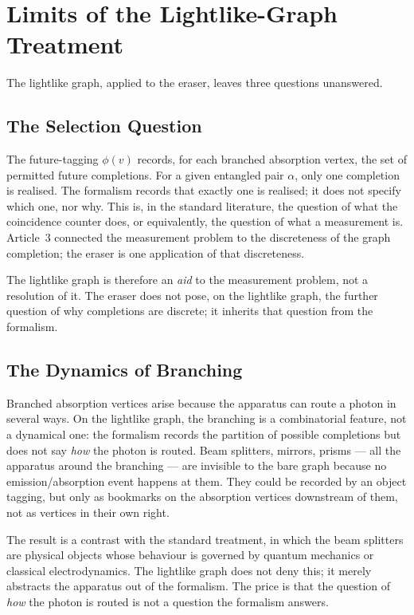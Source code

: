 \documentclass[11pt]{article}
\begin{document}
\section{Limits of the Lightlike-Graph Treatment}
\label{sec:limits}

The lightlike graph, applied to the eraser, leaves three questions unanswered.

\subsection{The Selection Question}

The future-tagging $\phi(v)$ records, for each branched absorption vertex, the set of permitted future completions. For a given entangled pair $\alpha$, only one completion is realised. The formalism records that exactly one is realised; it does not specify which one, nor why. This is, in the standard literature, the question of what the coincidence counter does, or equivalently, the question of what a measurement is. Article~3 connected the measurement problem to the discreteness of the graph completion; the eraser is one application of that discreteness.

The lightlike graph is therefore an \emph{aid} to the measurement problem, not a resolution of it. The eraser does not pose, on the lightlike graph, the further question of why completions are discrete; it inherits that question from the formalism.

\subsection{The Dynamics of Branching}

Branched absorption vertices arise because the apparatus can route a photon in several ways. On the lightlike graph, the branching is a combinatorial feature, not a dynamical one: the formalism records the partition of possible completions but does not say \emph{how} the photon is routed. Beam splitters, mirrors, prisms --- all the apparatus around the branching --- are invisible to the bare graph because no emission/absorption event happens at them. They could be recorded by an object tagging, but only as bookmarks on the absorption vertices downstream of them, not as vertices in their own right.

The result is a contrast with the standard treatment, in which the beam splitters are physical objects whose behaviour is governed by quantum mechanics or classical electrodynamics. The lightlike graph does not deny this; it merely abstracts the apparatus out of the formalism. The price is that the question of \emph{how} the photon is routed is not a question the formalism answers.
\end{document}
